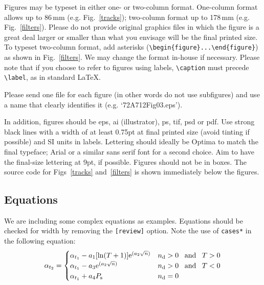 \documentclass[review,aog]{igs}
\begin{document}
Figures may be typeset in either one- or two-column format. One-column format allows up to 86$\,$mm (e.g. Fig.~\ref{tracks}); two-column format up to 178$\,$mm (e.g. Fig.~\ref{filters}). Please do not provide original graphics files in which the figure is a great deal larger or smaller than what you envisage will be the final printed size. To typeset two-column format, add asterisks (\verb"\begin{figure}...\end{figure}") as shown in Fig.~\ref{filters}. We may change the format in-house if necessary. Please note that if you choose to refer to figures using labels, \verb"\caption" must precede \verb"\label", as in standard \LaTeX. 

Please send one file for each figure (in other words do not use subfigures) and use a name that clearly identifies it (e.g. `72A712Fig03.eps').

In addition, figures should be eps, ai (illustrator), ps, tif, psd or pdf. Use strong black lines with a width of at least 0.75pt at final printed size (avoid tinting if possible) and SI units in labels. Lettering should ideally be Optima to match the final typeface; Arial or a similar sans serif font for a second choice. Aim to have the final-size lettering at 9pt, if possible. Figures should not be in boxes. The source code for Figs~\ref{tracks} and~\ref{filters} is shown immediately below the figures.


\subsection{Equations}

We are including some complex equations as examples. Equations should be checked for width by removing the \verb"[review]" option. Note the use of \verb|cases*| in the following equation:
\begin{equation}
\label{arrayexample}
\alpha_{t_2}= %
  \begin{cases}
    \alpha_{t_1} - a_1 [\ln (T+1)]
      \mathrm{e}^{(a_2\sqrt{n})}
      & \mbox{$n_\mathrm{d} > 0\enskip$ and
      $\enskip T > 0$}\\
    \alpha_{t_1} - a_3 \mathrm{e}^{(a_2\sqrt{n})}
      & \mbox{$n_\mathrm{d} > 0\enskip$ and
      $\enskip T < 0$}\\
    \alpha_{t_1} + a_4 P_\mathrm{s}
      & \mbox{$n_\mathrm{d} = 0$}
  \end{cases}
\end{equation}
\end{document}
